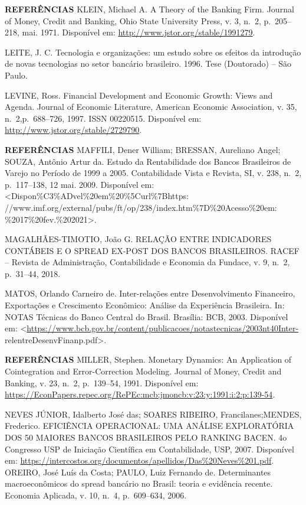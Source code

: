 \documentclass[
  ignorenonframetext,
  aspectratio=169,
  ignorenonframetext]{beamer}
\begin{document}
\begin{frame}{\textbf{REFERÊNCIAS}}
\protect\hypertarget{referuxeancias-17}{}
KLEIN, Michael A. A Theory of the Banking Firm. Journal of Money, Credit
and Banking, Ohio State University Press, v. 3, n.~2, p.~205--218, mai.
1971. Disponível em: \url{http://www.jstor.org/stable/1991279}.

LEITE, J. C. Tecnologia e organizações: um estudo sobre os efeitos da
introdução de novas tecnologias no setor bancário brasileiro. 1996. Tese
(Doutorado) -- São Paulo.

LEVINE, Ross. Financial Development and Economic Growth: Views and
Agenda. Journal of Economic Literature, American Economic Association,
v. 35, n.~2,p.~688--726, 1997. ISSN 00220515. Disponível em:
\url{http://www.jstor.org/stable/2729790}.
\end{frame}

\begin{frame}{\textbf{REFERÊNCIAS}}
\protect\hypertarget{referuxeancias-18}{}
MAFFILI, Dener William; BRESSAN, Aureliano Angel; SOUZA, Antônio Artur
da. Estudo da Rentabilidade dos Bancos Brasileiros de Varejo no Período
de 1999 a 2005. Contabilidade Vista e Revista, SI, v. 238, n.~2,
p.~117--138, 12 mai. 2009. Disponível em:
\textless Dispon\%C3\%ADvel\%20em\%20\%5Curl\%7Bhttps:
//www.imf.org/external/pubs/ft/op/238/index.htm\%7D\%20Acesso\%20em:
\%2017\%20fev.\%202021\textgreater.

MAGALHÃES-TIMOTIO, João G. RELAÇÃO ENTRE INDICADORES CONTÁBEIS E O
SPREAD EX-POST DOS BANCOS BRASILEIROS. RACEF -- Revista de
Administração, Contabilidade e Economia da Fundace, v. 9, n.~2,
p.~31--44, 2018.

MATOS, Orlando Carneiro de. Inter-relações entre Desenvolvimento
Financeiro, Exportações e Crescimento Econômico: Análise da Experiência
Brasileira. In: NOTAS Técnicas do Banco Central do Brasil. Brasília:
BCB, 2003. Disponível em:
\textless{}\url{https://www.bcb.gov.br/content/publicacoes/notastecnicas/2003nt40Inter-}
relentreDesenvFinanp.pdf\textgreater.
\end{frame}

\begin{frame}{\textbf{REFERÊNCIAS}}
\protect\hypertarget{referuxeancias-19}{}
MILLER, Stephen. Monetary Dynamics: An Application of Cointegration and
Error-Correction Modeling. Journal of Money, Credit and Banking, v. 23,
n.~2, p.~139--54, 1991. Disponível em:
\url{https://EconPapers.repec.org/RePEc:mcb:jmoncb:v:23:y:1991:i:2:p:139-54}.

NEVES JÚNIOR, Idalberto José das; SOARES RIBEIRO, Francilanes;MENDES,
Frederico. EFICIÊNCIA OPERACIONAL: UMA ANÁLISE EXPLORATÓRIA DOS 50
MAIORES BANCOS BRASILEIROS PELO RANKING BACEN. 4o Congresso USP de
Iniciação Científica em Contabilidade, USP, 2007. Disponível em:
\url{https://intercostos.org/documentos/apellidos/Das\%20Neves\%201.pdf}.
OREIRO, José Luís da Costa; PAULO, Luiz Fernando de. Determinantes
macroeconômicos do spread bancário no Brasil: teoria e evidência
recente. Economia Aplicada, v. 10, n.~4, p.~609--634, 2006.
\end{frame}
\end{document}
